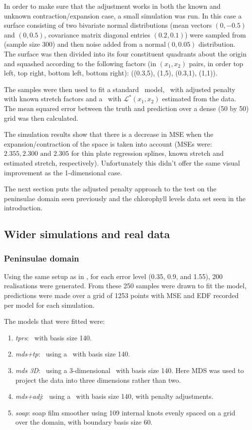 In order to make sure that the adjustment works in both the known and unknown contraction/expansion case, a small simulation was run. In this case a surface consisting of two bivariate normal distributions (mean vectors $(0,-0.5)$ and $(0,0.5)$, covariance matrix diagonal entries $(0.2,0.1)$) were sampled from (sample size 300) and then noise added from a $\text{normal}(0,0.05)$ distribution. The surface was then divided into its four constituent quadrants about the origin and squashed according to the following factors (in $(x_1,x_2)$ pairs, in order top left, top right, bottom left, bottom right): ((0.3,5), (1,5), (0.3,1), (1,1)).

The samples were then used to fit a standard \tprs\ model, \tprs\ with adjusted penalty with known stretch factors and a \tprs\ with $\mathcal{L}^*(x_1,x_2)$ estimated from the data. The mean squared error between the truth and prediction over a dense (50 by 50) grid was then calculated.

The simulation results show that there is a decrease in MSE when the expansion/contraction of the space is taken into account (MSEs were: $2.355, 2.300 \text{ and } 2.305$ for thin plate regression splines, known stretch and estimated stretch, respectively). Unfortunately this didn't offer the same visual improvement as the 1-dimensional case.

The next section puts the adjusted penalty approach to the test on the peninsulae domain seen previously and the chlorophyll levels data set seen in the introduction.

\subsection{Wider simulations and real data}

\subsubsection{Peninsulae domain}
\label{wt2bigsim}

Using the same setup as in , for each error level (0.35, 0.9, and 1.55), 200 realisations were generated. From these 250 samples were drawn to fit the model, predictions were made over a grid of 1253 points with MSE and EDF recorded per model for each simulation. 

The models that were fitted were:
\begin{enumerate}
\item \emph{tprs}: \tprs\ with basis size 140.
\item \emph{mds+tp}: \mdsap\ using a \tprs\ with basis size 140.
\item \emph{mds 3D}: \mdsap\ using a 3-dimensional \tprs\ with basis size 140. Here MDS was used to project the data into three dimensions rather than two.
\item \emph{mds+adj}: \mdsap\ using a \tprs\ with basis size 140, with penalty adjustments.
\item \emph{soap}: soap film smoother using 109 internal knots evenly spaced on a grid over the domain, with boundary basis size 60.
\end{enumerate}

